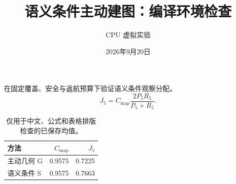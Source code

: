 \documentclass[UTF8,fontset=none]{ctexart}
\title{语义条件主动建图：编译环境检查}
\author{CPU 虚拟实验}
\date{2026年9月20日}
\begin{document}
\maketitle
在固定覆盖、安全与返航预算下验证语义条件观察分配。
\[
J_{5}=C_{\mathrm{map}}\frac{2P_{5}R_{5}}{P_{5}+R_{5}}.
\]
\begin{table}[h]
\centering
\begin{tabular}{lrr}
\toprule
方法 & $C_{\mathrm{map}}$ & $J_5$\\
\midrule
主动几何 G & 0.9575 & 0.7225\\
语义条件 S & 0.9575 & 0.7663\\
\bottomrule
\end{tabular}
\caption{仅用于中文、公式和表格排版检查的已保存均值。}
\end{table}
\end{document}
